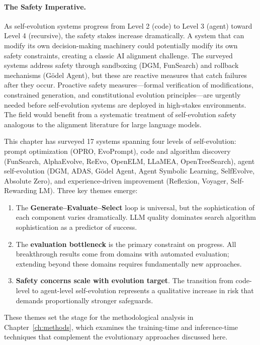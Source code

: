 \paragraph{The Safety Imperative.}
As self-evolution systems progress from Level 2 (code) to Level 3 (agent) toward Level 4 (recursive), the safety stakes increase dramatically. A system that can modify its own decision-making machinery could potentially modify its own safety constraints, creating a classic AI alignment challenge. The surveyed systems address safety through sandboxing (DGM, FunSearch) and rollback mechanisms (G\"{o}del Agent), but these are reactive measures that catch failures after they occur. Proactive safety measures---formal verification of modifications, constrained generation, and constitutional evolution principles---are urgently needed before self-evolution systems are deployed in high-stakes environments. The field would benefit from a systematic treatment of self-evolution safety analogous to the alignment literature for large language models.

This chapter has surveyed 17 systems spanning four levels of self-evolution: prompt optimization (OPRO, EvoPrompt), code and algorithm discovery (FunSearch, AlphaEvolve, ReEvo, OpenELM, LLaMEA, OpenTreeSearch), agent self-evolution (DGM, ADAS, G\"{o}del Agent, Agent Symbolic Learning, SelfEvolve, Absolute Zero), and experience-driven improvement (Reflexion, Voyager, Self-Rewarding LM). Three key themes emerge:

\begin{enumerate}
    \item The \textbf{Generate--Evaluate--Select} loop is universal, but the sophistication of each component varies dramatically. LLM quality dominates search algorithm sophistication as a predictor of success.
    \item The \textbf{evaluation bottleneck} is the primary constraint on progress. All breakthrough results come from domains with automated evaluation; extending beyond these domains requires fundamentally new approaches.
    \item \textbf{Safety concerns scale with evolution target}. The transition from code-level to agent-level self-evolution represents a qualitative increase in risk that demands proportionally stronger safeguards.
\end{enumerate}

These themes set the stage for the methodological analysis in Chapter~\ref{ch:methods}, which examines the training-time and inference-time techniques that complement the evolutionary approaches discussed here.

